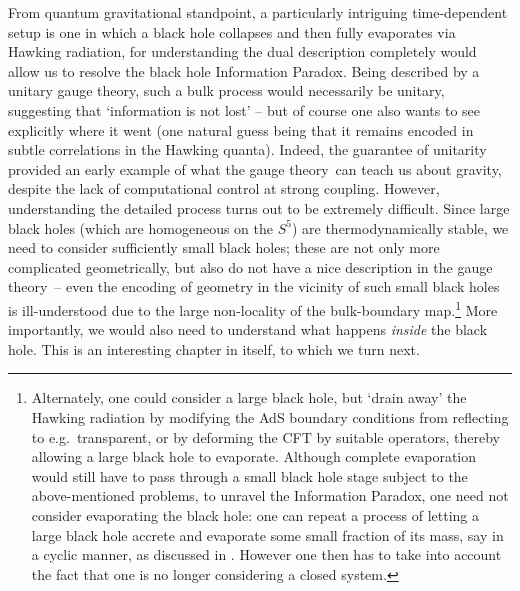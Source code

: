 \documentclass[12pt,a4paper]{article}
\def\GT{gauge theory}
\begin{document}
From quantum gravitational standpoint, a particularly intriguing time-dependent setup is one in which a black hole collapses and then fully evaporates via Hawking radiation, for understanding the dual description completely would allow us to resolve the black hole Information Paradox.  Being described by a unitary \GT, such a bulk process would necessarily be unitary, suggesting that `information is not lost' -- but of course one also wants to see explicitly where it went (one natural guess being that it remains encoded in subtle correlations in the Hawking quanta).
  Indeed, the guarantee of unitarity provided an early example of what the \GT\ can teach us about gravity, despite the lack of computational control at strong coupling.  However, understanding the detailed process turns out to be extremely difficult.
  Since large black holes (which are homogeneous on the $S^5$) are thermodynamically stable, we need to consider sufficiently small black holes; these are not only more complicated geometrically, but also do not have a nice description in the \GT\ -- even the encoding of geometry in the vicinity of such small black holes is ill-understood due to the large non-locality of the bulk-boundary map.\footnote{
Alternately, one could consider a large black hole, but `drain away' the Hawking radiation by modifying the AdS boundary conditions from reflecting to e.g.\ transparent, or by deforming the CFT by suitable operators, thereby allowing a large black hole to evaporate. Although complete evaporation would still have to pass through a small black hole stage subject to the above-mentioned problems, to unravel the Information Paradox, one need not consider evaporating the black hole:
one can repeat a process of letting a large black hole accrete and evaporate some small fraction of its mass, say in a cyclic manner, as discussed in \cite{Marolf:2008tx}.
 However one then has to take into account the fact that one is no longer considering a closed system. 
}
  More importantly, we would also need to understand what happens {\it inside} the black hole.  This is an interesting chapter in itself, to which we turn next.
  
\end{document}
